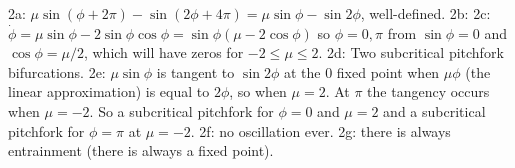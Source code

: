 \documentclass[12pt]{amsart}
\theoremstyle{conjecture}
\theoremstyle{definition}
\theoremstyle{question}
\theoremstyle{theorem}
\begin{document}
    \hspace*{1.5em}2a: $\mu\sin(\phi+2\pi)-\sin(2\phi+4\pi)=\mu\sin\phi-\sin2\phi$, well-defined.
    2b: \quad 2c: $\dot\phi=\mu\sin\phi-2\sin\phi\cos\phi=\sin\phi(\mu-2\cos\phi)$ so
    $\phi=0,\pi$ from $\sin\phi=0$ and $\cos\phi=\mu/2$, which will have zeros for
    $-2\leq\mu\leq2$. 2d: Two subcritical pitchfork bifurcations. 2e: $\mu\sin\phi$ is tangent to
    $\sin2\phi$ at the 0 fixed point when $\mu\phi$ (the linear approximation) is equal to $2\phi$, so
    when $\mu=2$. At $\pi$ the tangency occurs when $\mu=-2$. So a subcritical pitchfork for $\phi=0$
    and $\mu=2$ and a subcritical pitchfork for $\phi=\pi$ at $\mu=-2$. 2f: no oscillation ever.
    2g: there is always entrainment (there is always a fixed point).
\end{document}
